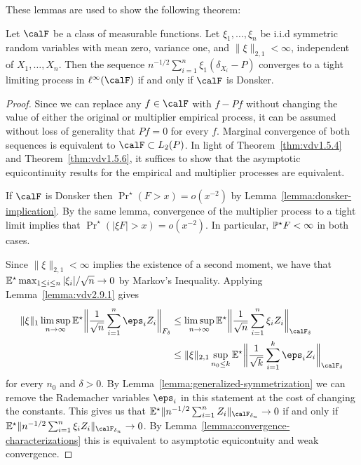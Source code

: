 These lemmas are used to show the following theorem: 
\begin{theorem}
	\label{thm:unconditional-multiplier-clt}
	Let \(\calF\) be a class of measurable functions. Let \(\xi_1,\dots,\xi_n\) be i.i.d symmetric random variables with mean zero, variance one, and \(\|\xi\|_{2,1} < \infty\), independent of \(X_1,\dots,X_n\). Then the sequence \(n^{-1/2}\sum_{i=1}^n \xi_1(\delta_{X_i}-P)\) converges to a tight limiting process in \(\ell^\infty(\calF)\) if and only if \(\calF\) is Donsker.
\end{theorem}
\begin{proof}
	Since we can replace any \(f\in\calF\) with \(f-Pf\) without changing the value of either the original or multiplier empirical process, it can be assumed without loss of generality that \(Pf=0\) for every \(f\). Marginal convergence of both sequences is equivalent to \(\calF\subset L_2(P)\). In light of Theorem~\ref{thm:vdv1.5.4} and Theorem~\ref{thm:vdv1.5.6}, it suffices to show that the asymptotic equicontinuity results for the empirical and multiplier processes are equivalent.

	If \(\calF\) is Donsker then \(\Pr^\star\left(F>x\right)=o(x^{-2})\) by Lemma~\ref{lemma:donsker-implication}. By the same lemma, convergence of the multiplier process to a tight limit implies that \(\Pr^\star\left(|\xi F|>x\right)=o(x^{-2})\). In particular, \(\P^\star F <\infty\) in both cases. 

	Since \(\|\xi\|_{2,1}<\infty\) implies the existence of a second moment, we have that \(\E^\star\max_{1\leq i\leq n}|\xi_i|/\sqrt{n}\to 0\) by Markov's Inequality. Applying Lemma~\ref{lemma:vdv2.9.1} gives
	\begin{align*}
	   \|\xi\|_1\limsup_{n\to\infty}\E^\star\bigg\|\frac{1}{\sqrt{n}}\sum_{i=1}^n \eps_iZ_i\bigg\|_{F_\delta} 	
	   &\leq \limsup_{n\to\infty}\E^\star\bigg\|\frac{1}{\sqrt{n}}\sum_{i=1}^n \xi_iZ_i\bigg\|_{\calF_\delta} \\
	   &\leq \|\xi\|_{2,1}\sup_{n_0\leq k}\E^\star\bigg\|\frac{1}{\sqrt{k}}\sum_{i=1}^k\eps_iZ_i\bigg\|_{\calF_\delta}
	\end{align*}
	for every \(n_0\) and \(\delta > 0\). By Lemma~\ref{lemma:generalized-symmetrization} we can remove the Rademacher variables \(\eps_i\) in this statement at the cost of changing the constants. This gives us that \(\E^\star\|n^{-1/2}\sum_{i=1}^n Z_i\|_{\calF_{\delta_n}}\to 0\) if and only if \(\E^\star\|n^{-1/2}\sum_{i=1}^n \xi_iZ_i\|_{\calF_{\delta_n}}\to 0\). By Lemma~\ref{lemma:convergence-characterizations} this is equivalent to asymptotic equicontuity and weak convergence.
\end{proof}
